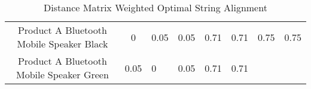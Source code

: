 \documentclass[]{article}
\begin{document}
\begin{longtable}[]{@{}ccllllll@{}}
\caption{Distance Matrix Weighted Optimal String
Alignment}\tabularnewline
\toprule
\begin{minipage}[t]{0.36\columnwidth}\centering\strut
Product A Bluetooth Mobile Speaker Black\strut
\end{minipage} & \begin{minipage}[t]{0.05\columnwidth}\centering\strut
0\strut
\end{minipage} & \begin{minipage}[t]{0.05\columnwidth}\raggedright\strut
0.05\strut
\end{minipage} & \begin{minipage}[t]{0.05\columnwidth}\raggedright\strut
0.05\strut
\end{minipage} & \begin{minipage}[t]{0.05\columnwidth}\raggedright\strut
0.71\strut
\end{minipage} & \begin{minipage}[t]{0.05\columnwidth}\raggedright\strut
0.71\strut
\end{minipage} & \begin{minipage}[t]{0.05\columnwidth}\raggedright\strut
0.75\strut
\end{minipage} & \begin{minipage}[t]{0.05\columnwidth}\raggedright\strut
0.75\strut
\end{minipage}\tabularnewline
\begin{minipage}[t]{0.36\columnwidth}\centering\strut
Product A Bluetooth Mobile Speaker Green\strut
\end{minipage} & \begin{minipage}[t]{0.05\columnwidth}\centering\strut
0.05\strut
\end{minipage} & \begin{minipage}[t]{0.05\columnwidth}\raggedright\strut
0\strut
\end{minipage} & \begin{minipage}[t]{0.05\columnwidth}\raggedright\strut
0.05\strut
\end{minipage} & \begin{minipage}[t]{0.05\columnwidth}\raggedright\strut
0.71\strut
\end{minipage} & \begin{minipage}[t]{0.05\columnwidth}\raggedright\strut
0.71\strut
\end{minipage} & \begin{minipage}[t]{0.05\columnwidth}\raggedright\strut

\end{minipage}
\end{longtable}
\end{document}
